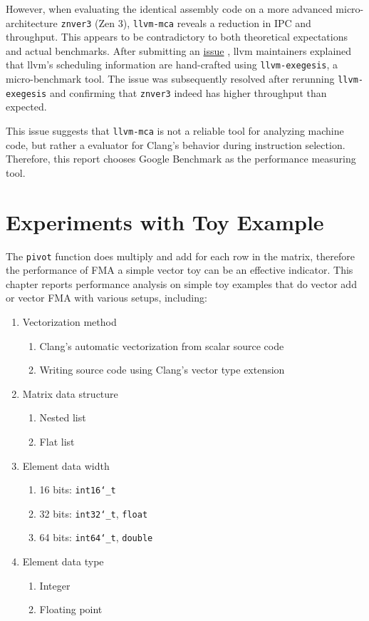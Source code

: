 \documentclass[logo,bsc,singlespacing,parskip]{infthesis}
\newcommand{\dtshort}{\texttt{int16\char`_t}}
\newcommand{\dtint}{\texttt{int32\char`_t}}
\newcommand{\dtlong}{\texttt{int64\char`_t}}
\newcommand{\dtfloat}{\texttt{float}}
\newcommand{\dtdouble}{\texttt{double}}
\newcommand{\pivot}{\texttt{pivot}}
\newcommand{\mca}{\texttt{llvm-mca}}
\newcommand{\exegesis}{\texttt{llvm-exegesis}}
\newenvironment{compactlist}
{ \begin{enumerate}
    \setlength{\itemsep}{0pt}
    \setlength{\parskip}{0pt}
    \setlength{\parsep}{0pt}     
}
{ \end{enumerate} }
\begin{document}

However, when evaluating the identical assembly code on a more advanced
micro-architecture \texttt{znver3} (Zen 3), \mca{} reveals a reduction in IPC and
throughput. This appears to be contradictory to both theoretical expectations
and actual benchmarks. After submitting an
\href{https://github.com/llvm/llvm-project/issues/59325}{issue}
\cite{mca-issue}, llvm maintainers explained that llvm's scheduling information
are hand-crafted using \exegesis{}, a micro-benchmark tool. The issue was
subsequently resolved after rerunning \exegesis{} and confirming that
\texttt{znver3} indeed has higher throughput than expected. 

This issue suggests that \mca{} is not a reliable tool for analyzing machine
code, but rather a evaluator for Clang's behavior during instruction selection.
Therefore, this report chooses Google Benchmark as the performance measuring
tool.


\chapter{Experiments with Toy Example}
\label{sec:Toy}

The \pivot{} function does multiply and add for each row in the matrix,
therefore the performance of FMA a simple vector toy can be an effective
indicator. This chapter reports performance analysis on simple toy examples that
do vector add or vector FMA with various setups, including: 

\begin{enumerate} 
    \item Vectorization method 
        \begin{compactlist} 
            \item Clang's automatic vectorization from scalar source code
            \item Writing source code using Clang's vector type extension
        \end{compactlist}
    \item Matrix data structure 
        \begin{compactlist} 
            \item Nested list
            \item Flat list
        \end{compactlist}
    \item Element data width
        \begin{compactlist} 
            \item 16 bits: \dtshort{}
            \item 32 bits: \dtint{}, \dtfloat{}
            \item 64 bits: \dtlong{}, \dtdouble{}
        \end{compactlist}
    \item Element data type 
        \begin{compactlist} 
            \item Integer
            \item Floating point
        \end{compactlist}
\end{enumerate}
\end{document}
